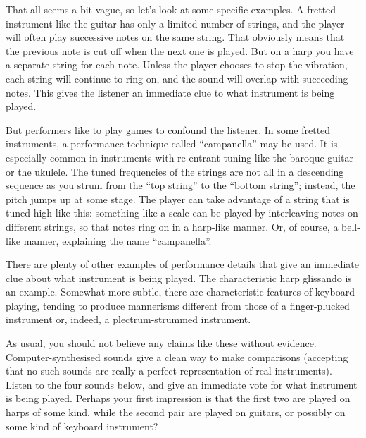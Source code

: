   That all seems a bit vague, so let’s look at some specific examples. A 
  fretted instrument like the guitar has only a limited number of strings, and 
  the player will often play successive notes on the same string. That 
  obviously means that the previous note is cut off when the next one is 
  played. But on a harp you have a separate string for each note. Unless the 
  player chooses to stop the vibration, each string will continue to ring on, 
  and the sound will overlap with succeeding notes. This gives the listener an 
  immediate clue to what instrument is being played. 

  But performers like to play games to confound the listener. In some fretted 
  instruments, a performance technique called “campanella” may be used. It is 
  especially common in instruments with re-entrant tuning like the baroque 
  guitar or the ukulele. The tuned frequencies of the strings are not all in a 
  descending sequence as you strum from the “top string” to the “bottom 
  string”; instead, the pitch jumps up at some stage. The player can take 
  advantage of a string that is tuned high like this: something like a scale 
  can be played by interleaving notes on different strings, so that notes ring 
  on in a harp-like manner. Or, of course, a bell-like manner, explaining the 
  name “campanella”. 

  There are plenty of other examples of performance details that give an 
  immediate clue about what instrument is being played. The characteristic harp 
  glissando is an example. Somewhat more subtle, there are characteristic 
  features of keyboard playing, tending to produce mannerisms different from 
  those of a finger-plucked instrument or, indeed, a plectrum-strummed 
  instrument. 

  As usual, you should not believe any claims like these without evidence. 
  Computer-synthesised sounds give a clean way to make comparisons (accepting 
  that no such sounds are really a perfect representation of real instruments). 
  Listen to the four sounds below, and give an immediate vote for what 
  instrument is being played. Perhaps your first impression is that the first 
  two are played on harps of some kind, while the second pair are played on 
  guitars, or possibly on some kind of keyboard instrument? 




